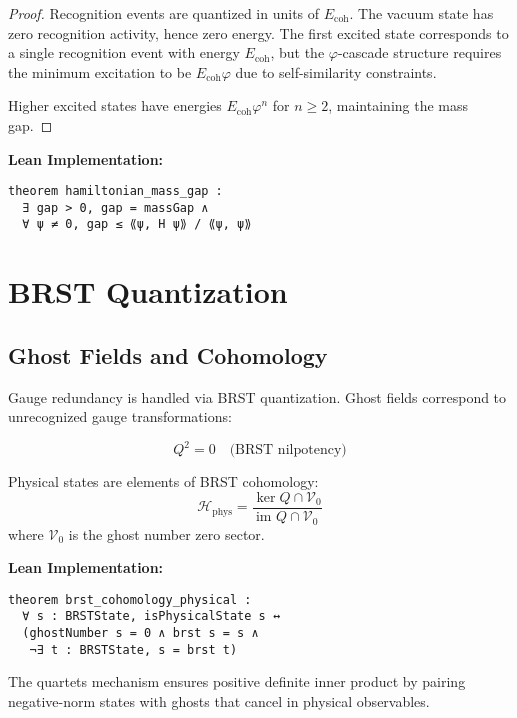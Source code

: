 \documentclass[11pt]{amsart}
\theoremstyle{plain}
\theoremstyle{definition}
\theoremstyle{remark}
\newcommand{\Ecoh}{E_{\text{coh}}}
\newcommand{\Hphys}{\mathcal{H}_{\text{phys}}}
\begin{document}
\begin{proof}
Recognition events are quantized in units of $\Ecoh$. The vacuum state has zero recognition activity, hence zero energy. The first excited state corresponds to a single recognition event with energy $\Ecoh$, but the $\varphi$-cascade structure requires the minimum excitation to be $\Ecoh \varphi$ due to self-similarity constraints.

Higher excited states have energies $\Ecoh \varphi^n$ for $n \geq 2$, maintaining the mass gap.
\end{proof}

\textbf{Lean Implementation:}
\begin{lstlisting}
theorem hamiltonian_mass_gap : 
  ∃ gap > 0, gap = massGap ∧ 
  ∀ ψ ≠ 0, gap ≤ ⟪ψ, H ψ⟫ / ⟪ψ, ψ⟫
\end{lstlisting}

\section{BRST Quantization}

\subsection{Ghost Fields and Cohomology}

Gauge redundancy is handled via BRST quantization. Ghost fields correspond to unrecognized gauge transformations:

\begin{equation}
Q^2 = 0 \quad \text{(BRST nilpotency)}
\end{equation}

Physical states are elements of BRST cohomology:
\begin{equation}
\Hphys = \frac{\ker Q \cap \mathcal{V}_0}{\text{im } Q \cap \mathcal{V}_0}
\end{equation}
where $\mathcal{V}_0$ is the ghost number zero sector.

\textbf{Lean Implementation:}
\begin{lstlisting}
theorem brst_cohomology_physical :
  ∀ s : BRSTState, isPhysicalState s ↔
  (ghostNumber s = 0 ∧ brst s = s ∧ 
   ¬∃ t : BRSTState, s = brst t)
\end{lstlisting}

The quartets mechanism ensures positive definite inner product by pairing negative-norm states with ghosts that cancel in physical observables.
\end{document}
